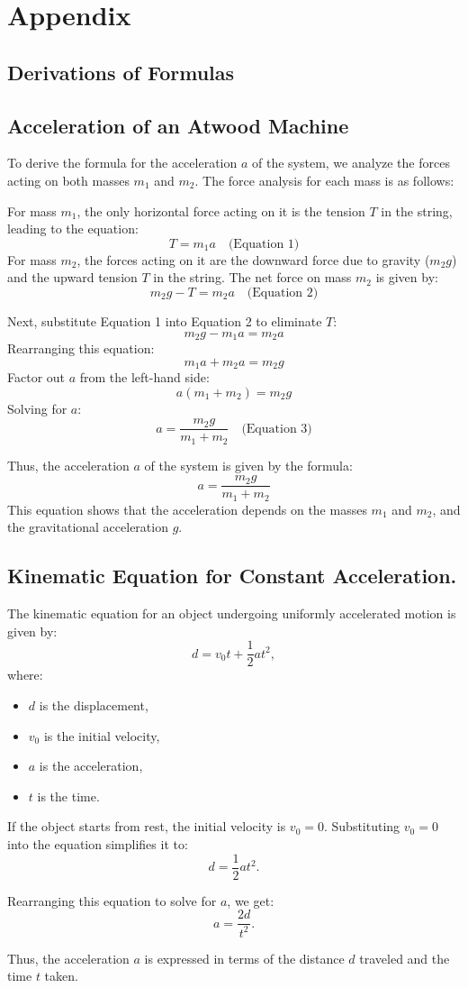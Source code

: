 \section{Appendix}

\subsection*{Derivations of Formulas}

\subsection{Acceleration of an Atwood Machine}


To derive the formula for the acceleration \(a\) of the system, we analyze the forces acting on both masses \(m_1\) and \(m_2\). The force analysis for each mass is as follows:

For mass \( m_1 \), the only horizontal force acting on it is the tension \( T \) in the string, leading to the equation:
\[
T = m_1a \quad \text{(Equation 1)}
\]
For mass \( m_2 \), the forces acting on it are the downward force due to gravity (\( m_2g \)) and the upward tension \( T \) in the string. The net force on mass \( m_2 \) is given by:
\[
m_2g - T = m_2a \quad \text{(Equation 2)}
\]

Next, substitute Equation 1 into Equation 2 to eliminate \( T \):
\[
m_2g - m_1a = m_2a
\]
Rearranging this equation:
\[
m_1a + m_2a = m_2g
\]
Factor out \( a \) from the left-hand side:
\[
a(m_1 + m_2) = m_2g
\]
Solving for \( a \):
\[
a = \frac{m_2g}{m_1 + m_2} \quad \text{(Equation 3)}
\]

Thus, the acceleration \( a \) of the system is given by the formula:
\[
a = \frac{m_2g}{m_1 + m_2}
\]
This equation shows that the acceleration depends on the masses \( m_1 \) and \( m_2 \), and the gravitational acceleration \( g \).

\subsection{Kinematic Equation for Constant Acceleration.}

The kinematic equation for an object undergoing uniformly accelerated motion is given by:
\[
d = v_0 t + \frac{1}{2} a t^2,
\]
where:
\begin{itemize}
    \item \( d \) is the displacement,
    \item \( v_0 \) is the initial velocity,
    \item \( a \) is the acceleration,
    \item \( t \) is the time.
\end{itemize}

If the object starts from rest, the initial velocity is \( v_0 = 0 \). Substituting \( v_0 = 0 \) into the equation simplifies it to:
\[
d = \frac{1}{2} a t^2.
\]

Rearranging this equation to solve for \( a \), we get:
\[
a = \frac{2d}{t^2}.
\]

Thus, the acceleration \( a \) is expressed in terms of the distance \( d \) traveled and the time \( t \) taken.